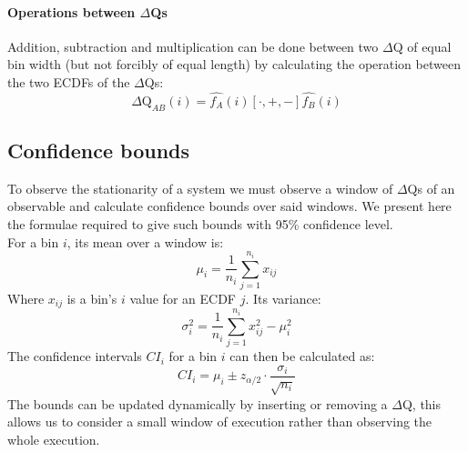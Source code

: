     \paragraph{Operations between $\Delta$Qs} 
        Addition, subtraction and multiplication can be done between two $\Delta$Q of equal bin width (but not forcibly of equal length) by calculating the operation between the two ECDFs of the $\Delta$Qs:
        \begin{equation}
            \Delta \text{Q}_{AB}(i) = \hat{f_A}(i) [\cdot, +, -] \hat{f_B}(i)
            \label{eq:op_dq}
        \end{equation}
    \subsection{Confidence bounds}
    To observe the stationarity of a system we must observe a window of $\Delta$Qs of an observable and calculate confidence bounds over said windows. We present here the formulae required to give such bounds with 95\% confidence level. \\
        For a bin $i$, its mean over a window is:
            \begin{equation}
                \mu_i = \dfrac{1}{n_i} \sum_{j=1}^{n_i} x_{ij}
                \label{eq:mean_ecdf}
            \end{equation}
        Where $x_{ij}$ is a bin's $i$ value for an ECDF $j$.
        Its variance:
            \begin{equation}
                \sigma^2_i = \dfrac{1}{n_i} \sum_{j=1}^{n_i} x^2_{ij} - \mu^2_i
                \label{eq:var_ecdf}
            \end{equation}
        The confidence intervals $CI_i$ for a bin $i$ can then be calculated as:
        \begin{equation}
            CI_i = \mu_i \pm z_{\alpha/2} \cdot \dfrac{\sigma_i}{\sqrt{n_i}}      
            \label{eq:ci_i}
        \end{equation}
    The bounds can be updated dynamically by inserting or removing a $\Delta$Q, this allows us to consider a small window of execution rather than observing the whole execution.
